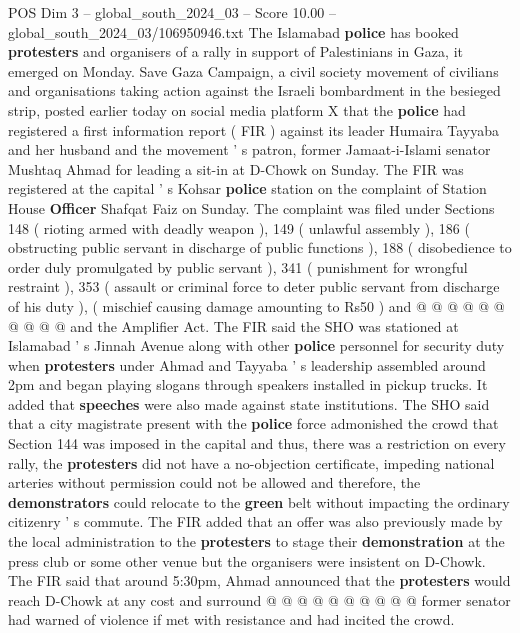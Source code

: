 \begin{textsample}{POS Dim 3 – global\_south\_2024\_03 – Score 10.00 – global\_south\_2024\_03/106950946.txt}  \label{ex:f3_pos_420}
The Islamabad \textbf{police} has booked \textbf{protesters} and organisers of a rally in support of Palestinians in Gaza, it emerged on Monday.
Save Gaza Campaign, a civil society movement of civilians and organisations taking action against the Israeli bombardment in the besieged strip, posted earlier today on social media platform X that the \textbf{police} had registered a first information report ( FIR ) against its leader Humaira Tayyaba and her husband and the movement ' s patron, former Jamaat-i-Islami senator Mushtaq Ahmad for leading a sit-in at D-Chowk on Sunday.
The FIR was registered at the capital ' s Kohsar \textbf{police} station on the complaint of Station House \textbf{Officer} Shafqat Faiz on Sunday.
The complaint was filed under Sections 148 ( rioting armed with deadly weapon ), 149 ( unlawful assembly ), 186 ( obstructing public servant in discharge of public functions ), 188 ( disobedience to order duly promulgated by public servant ), 341 ( punishment for wrongful restraint ), 353 ( assault or criminal force to deter public servant from discharge of his duty ), ( mischief causing damage amounting to Rs50 ) and @ @ @ @ @ @ @ @ @ @ and the Amplifier Act.
The FIR said the SHO was stationed at Islamabad ' s Jinnah Avenue along with other \textbf{police} personnel for security duty when \textbf{protesters} under Ahmad and Tayyaba ' s leadership assembled around 2pm and began playing slogans through speakers installed in pickup trucks.
It added that \textbf{speeches} were also made against state institutions.
The SHO said that a city magistrate present with the \textbf{police} force admonished the crowd that Section 144 was imposed in the capital and thus, there was a restriction on every rally, the \textbf{protesters} did not have a no-objection certificate, impeding national arteries without permission could not be allowed and therefore, the \textbf{demonstrators} could relocate to the \textbf{green} belt without impacting the ordinary citizenry ' s commute.
The FIR added that an offer was also previously made by the local administration to the \textbf{protesters} to stage their \textbf{demonstration} at the press club or some other venue but the organisers were insistent on D-Chowk.
The FIR said that around 5:30pm, Ahmad announced that the \textbf{protesters} would reach D-Chowk at any cost and surround @ @ @ @ @ @ @ @ @ @ former senator had warned of violence if met with resistance and had incited the crowd.

\end{textsample}

